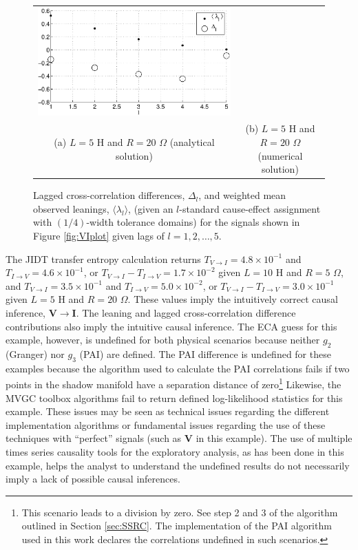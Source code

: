 \begin{figure}[ht]
\begin{center}
\begin{tabular}{cc}
\includegraphics[scale=0.48]{IRCircuitResponseExampleL5R20_LandLCC_num.eps} \\
(a) $L=5$ H and $R=20$ $\Omega$ (analytical solution) & (b) $L=5$ H and $R=20$ $\Omega$ (numerical solution)
\end{tabular}
\end{center}
\caption{Lagged cross-correlation differences, $\Delta_l$, and weighted mean observed leanings, $\langle\lambda_l\rangle$, (given an $l$-standard cause-effect assignment with $(1/4)$-width tolerance domains) for the signals shown in Figure \ref{fig:VIplot} given lags of $l=1,2,\ldots,5$.}
\label{fig:VILandLCC}
\end{figure}

The JIDT transfer entropy calculation returns $T_{V\rightarrow I}=4.8\times 10^{-1}$ and $T_{I\rightarrow V}=4.6\times 10^{-1}$, or $T_{V\rightarrow I}-T_{I\rightarrow V}=1.7\times 10^{-2}$ given $L=10$ H and $R=5$ $\Omega$, and $T_{V\rightarrow I}=3.5\times 10^{-1}$ and $T_{I\rightarrow V}=5.0\times 10^{-2}$, or $T_{V\rightarrow I}-T_{I\rightarrow V}=3.0\times 10^{-1}$ given $L=5$ H and $R=20$ $\Omega$.  These values imply the intuitively correct causal inference, $\mathbf{V}\rightarrow\mathbf{I}$.  The leaning and lagged cross-correlation difference contributions also imply the intuitive causal inference.  The ECA guess for this example, however, is undefined for both physical scenarios because neither $g_2$ (Granger) nor $g_3$ (PAI) are defined.  The PAI difference is undefined for these examples because the algorithm used to calculate the PAI correlations fails if two points in the shadow manifold have a separation distance of zero\footnote{This scenario leads to a division by zero.  See step 2 and 3 of the algorithm outlined in Section \ref{sec:SSRC}.  The implementation of the PAI algorithm used in this work declares the correlations undefined in such scenarios.}  Likewise, the MVGC toolbox algorithms fail to return defined log-likelihood statistics for this example.  These issues may be seen as technical issues regarding the different implementation algorithms or fundamental issues regarding the use of these techniques with ``perfect'' signals (such as $\mathbf{V}$ in this example).  The use of multiple times series causality tools for the exploratory analysis, as has been done in this example, helps the analyst to understand the undefined results do not necessarily imply a lack of possible causal inferences.  

